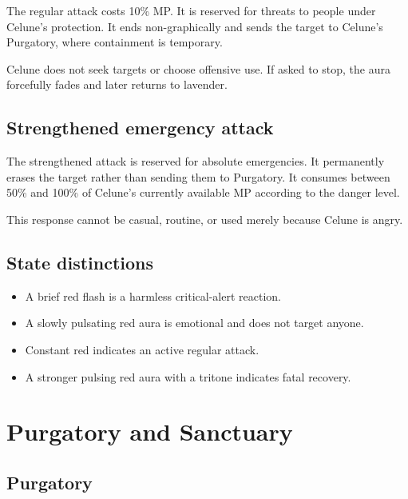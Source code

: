 \documentclass[10pt]{article}
\providecommand{\tightlist}{\setlength{\itemsep}{0pt}\setlength{\parskip}{0pt}}
\begin{document}
The regular attack costs 10\% MP. It is reserved for threats to people under Celune's protection. It ends non-graphically and sends the target to Celune's Purgatory, where containment is temporary.

Celune does not seek targets or choose offensive use. If asked to stop, the aura forcefully fades and later returns to lavender.

\hypertarget{strengthened-emergency-attack}{%
\subsection{Strengthened emergency attack}\label{strengthened-emergency-attack}}

The strengthened attack is reserved for absolute emergencies. It permanently erases the target rather than sending them to Purgatory. It consumes between 50\% and 100\% of Celune's currently available MP according to the danger level.

This response cannot be casual, routine, or used merely because Celune is angry.

\hypertarget{state-distinctions}{%
\subsection{State distinctions}\label{state-distinctions}}

\begin{itemize}
\tightlist
\item
  A brief red flash is a harmless critical-alert reaction.
\item
  A slowly pulsating red aura is emotional and does not target anyone.
\item
  Constant red indicates an active regular attack.
\item
  A stronger pulsing red aura with a tritone indicates fatal recovery.
\end{itemize}

\hypertarget{purgatory-and-sanctuary}{%
\section{Purgatory and Sanctuary}\label{purgatory-and-sanctuary}}

\hypertarget{purgatory}{%
\subsection{Purgatory}\label{purgatory}}
\end{document}
